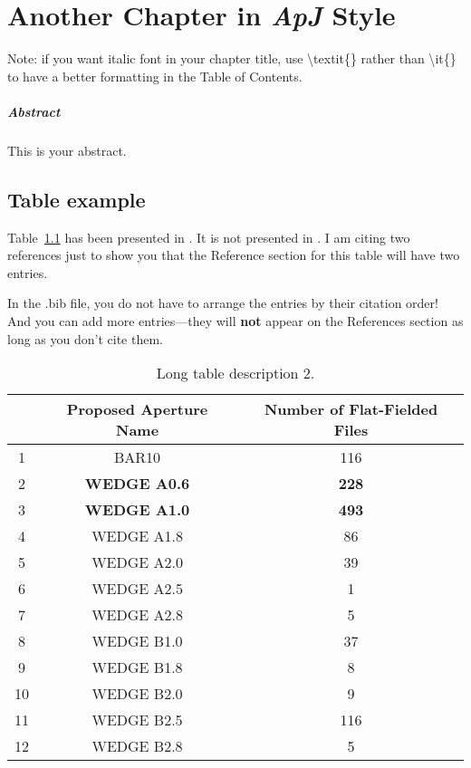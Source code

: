 \chapter{Another Chapter in \textit{ApJ} Style}\label{chapter-apj-dup}
Note: if you want italic font in your chapter title, use \textbackslash{textit}\{\} rather than \textbackslash{it}\{\} to have a better formatting in the Table of Contents.
\paragraph*{Abstract} This is your abstract.

\section{Table example}
Table~\ref{tab:stis-obs} has been presented in \citet{ren17}. It is not presented in \citet{ren18}. I am citing two references just to show you that the Reference section for this table will have two entries.

In the .bib file, you do not have to arrange the entries by their citation order! And you can add more entries---they will \textbf{not} appear on the References section as long as you don't cite them.


\begin{table}[htb!]
\centering
\caption[Short table description 2.]{Long table description 2.}
\label{tab:stis-obs}
\begin{tabular}{ccc}\hline\hline
   & Proposed Aperture Name & Number of Flat-Fielded Files \\ \hline
1  & BAR10                  & 116             \\
2  & {\bf WEDGE A0.6}             & {\bf 228}            \\
3  & {\bf WEDGE A1.0}             & {\bf 493}             \\
4  & WEDGE A1.8             & 86              \\
5  & WEDGE A2.0             & 39              \\
6  & WEDGE A2.5             & 1               \\
7  & WEDGE A2.8             & 5               \\
8  & WEDGE B1.0             & 37              \\
9  & WEDGE B1.8             & 8               \\
10 & WEDGE B2.0             & 9               \\
11 & WEDGE B2.5             & 116             \\
12 & WEDGE B2.8             & 5\\ \hline
\end{tabular}
\end{table}
